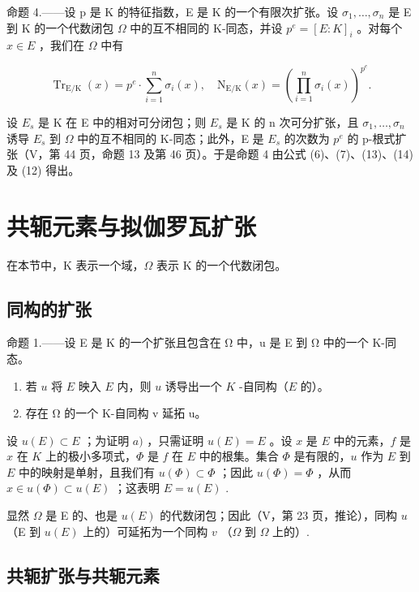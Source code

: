 命题 4.——设 p 是 K 的特征指数，E 是 K 的一个有限次扩张。设 \(\sigma_{1}, \ldots, \sigma_{n}\) 是 E 到 K 的一个代数闭包 \(\Omega\) 中的互不相同的 K-同态，并设 \(p^{e} = [E : K]_{i}\) 。对每个 \(x \in E\) ，我们在 \(\Omega\) 中有

\[
\operatorname{Tr} _ {\mathrm{E} / \mathrm{K}} (x) = p ^ {e} \cdot \sum_ {i = 1} ^ {n} \sigma_ {i} (x), \quad \mathrm{N} _ {\mathrm{E} / \mathrm{K}} (x) = \left(\prod_ {i = 1} ^ {n} \sigma_ {i} (x)\right) ^ {p ^ {e}}.\tag{15}
\]

设 \(E_s\) 是 K 在 E 中的相对可分闭包；则 \(E_s\) 是 K 的 n 次可分扩张，且 \(\sigma_1, \ldots, \sigma_n\) 诱导 \(E_s\) 到 \(\Omega\) 中的互不相同的 K-同态；此外，E 是 \(E_s\) 的次数为 \(p^e\) 的 p-根式扩张（V，第 44 页，命题 13 及第 46 页）。于是命题 4 由公式 (6)、(7)、(13)、(14) 及 (12) 得出。

\section{共轭元素与拟伽罗瓦扩张}

在本节中，K 表示一个域，\(\Omega\) 表示 K 的一个代数闭包。

\subsection{同构的扩张}

命题 1.——设 E 是 K 的一个扩张且包含在 Ω 中，u 是 E 到 Ω 中的一个 K-同态。

\begin{enumerate}
\def\labelenumi{\alph{enumi})}
\item
  若 \(u\) 将 \(E\) 映入 \(E\) 内，则 \(u\) 诱导出一个 \(K\) -自同构（\(E\) 的）。
\item
  存在 Ω 的一个 K-自同构 v 延拓 u。
\end{enumerate}

设 \(u(E) \subset E\) ；为证明 \(a)\) ，只需证明 \(u(E) = E\) 。设 \(x\) 是 \(E\) 中的元素，\(f\) 是 \(x\) 在 \(K\) 上的极小多项式，\(\Phi\) 是 \(f\) 在 \(E\) 中的根集。集合 \(\Phi\) 是有限的，\(u\) 作为 \(E\) 到 \(E\) 中的映射是单射，且我们有 \(u(\Phi) \subset \Phi\) ；因此 \(u(\Phi) = \Phi\) ，从而 \(x \in u(\Phi) \subset u(E)\) ；这表明 \(E = u(E)\) .

显然 \(\Omega\) 是 E 的、也是 \(u(E)\) 的代数闭包；因此（V，第 23 页，推论），同构 \(u\) （E 到 \(u(E)\) 上的）可延拓为一个同构 \(v\) （\(\Omega\) 到 \(\Omega\) 上的）.

\subsection{共轭扩张与共轭元素}

